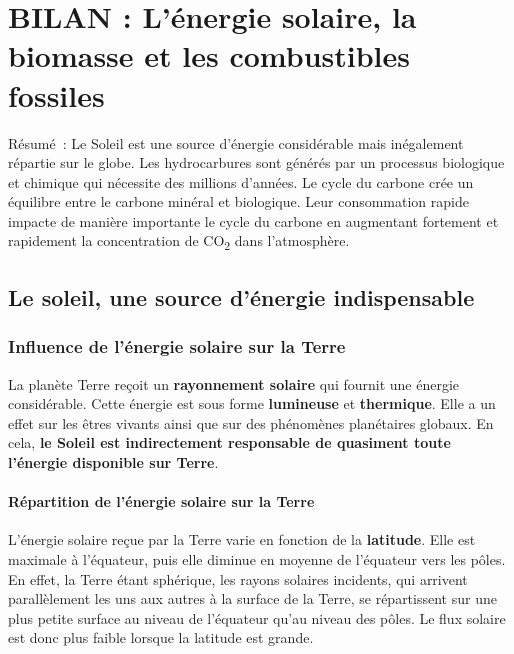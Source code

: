 %
\chapter{BILAN : L'énergie solaire, la biomasse et les combustibles fossiles}

Résumé~: Le Soleil est une source d'énergie considérable mais
inégalement répartie sur le globe. Les hydrocarbures sont générés par un
processus biologique et chimique qui nécessite des millions d'années. Le
cycle du carbone crée un équilibre entre le carbone minéral et
biologique. Leur consommation rapide impacte de manière importante le
cycle du carbone en augmentant fortement et rapidement la concentration
de CO\textsubscript{2} dans l'atmosphère.


  \section{Le soleil, une source d'énergie
  indispensable}\label{le-soleil-une-source-duxe9nergie-indispensable}


    \subsection{Influence de l'énergie solaire sur la
    Terre}\label{influence-de-luxe9nergie-solaire-sur-la-terre}
  

La planète Terre reçoit un \textbf{rayonnement solaire} qui fournit une
énergie considérable. Cette énergie est sous forme \textbf{lumineuse} et
\textbf{thermique}. Elle a un effet sur les êtres vivants ainsi que sur
des phénomènes planétaires globaux. En cela, \textbf{le Soleil est
indirectement responsable de quasiment toute l'énergie disponible sur
Terre}.

\subsubsection{Répartition de l'énergie solaire sur la
Terre}\label{ruxe9partition-de-luxe9nergie-solaire-sur-la-terre}

L'énergie solaire reçue par la Terre varie en fonction de la
\textbf{latitude}. Elle est maximale à l'équateur, puis elle diminue en
moyenne de l'équateur vers les pôles. En effet, la Terre étant
sphérique, les rayons solaires incidents, qui arrivent parallèlement les
uns aux autres à la surface de la Terre, se répartissent sur une plus
petite surface au niveau de l'équateur qu'au niveau des pôles. Le flux
solaire est donc plus faible lorsque la latitude est grande.

